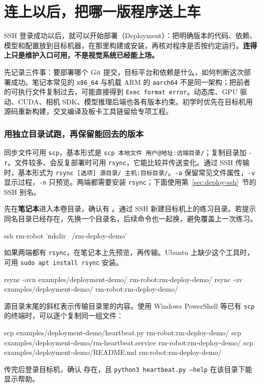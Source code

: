 \section{连上以后，把哪一版程序送上车}
\label{sec:deploy-delivery}

SSH 登录成功以后，就可以开始部署（Deployment）：把明确版本的代码、依赖、模型和配置放到目标机器，在那里构建或安装，再核对程序是否按约定运行。\textbf{连得上只是维护入口可用，不是视觉系统已经能上场。}

先记录三件事：要部署哪个 Git 提交，目标平台和依赖是什么，如何判断这次部署成功。笔记本常见的 \texttt{x86\_64} 与机载 ARM 的 \texttt{aarch64} 不是同一架构；把前者的可执行文件复制过去，可能直接得到 \texttt{Exec format error}。动态库、GPU 驱动、CUDA、相机 SDK、模型推理后端也各有版本约束。初学时优先在目标机用源码重新构建，交叉编译及板卡工具链留给专项工程。

\subsubsection{用独立目录试跑，再保留能回去的版本}

同步文件可用 \texttt{scp}，基本形式是 \texttt{scp 本地文件 用户@地址:远端目录/}；复制目录加 \texttt{-r}。文件较多、会反复部署时可用 \texttt{rsync}，它能比较并传送变化。通过 SSH 传输时，基本形式为 \texttt{rsync [选项] 源目录/ 主机:目标目录/}。\texttt{-a} 保留常见文件属性，\texttt{-v} 显示过程，\texttt{-n} 只预览。两端都需要安装 \texttt{rsync}；下面使用第~\ref{sec:deploy-ssh}~节的 SSH 别名。

\begin{example}
先在\textbf{笔记本}进入本卷目录，确认有 。通过 SSH 新建目标机上的练习目录。若提示同名目录已经存在，先换一个目录名，后续命令也一起换，避免覆盖上一次练习。

\begin{tbash}
ssh rm-robot 'mkdir ~/rm-deploy-demo'
\end{tbash}

如果两端都有 \texttt{rsync}，在笔记本上先预览，再传输。Ubuntu 上缺少这个工具时，可用 \texttt{sudo apt install rsync} 安装。
\begin{tbash}
rsync -avn examples/deployment-demo/ rm-robot:rm-deploy-demo/
rsync -av examples/deployment-demo/ rm-robot:rm-deploy-demo/
\end{tbash}
源目录末尾的斜杠表示传输目录里的内容。使用 Windows PowerShell 等已有 \texttt{scp} 的终端时，可以逐个复制同一组文件：
\begin{tbash}
scp examples/deployment-demo/heartbeat.py rm-robot:rm-deploy-demo/
scp examples/deployment-demo/rm-heartbeat.service rm-robot:rm-deploy-demo/
scp examples/deployment-demo/README.md rm-robot:rm-deploy-demo/
\end{tbash}
传完后登录目标机，确认  存在，且 \texttt{python3 heartbeat.py --help} 在该目录下能显示帮助。
\end{example}

